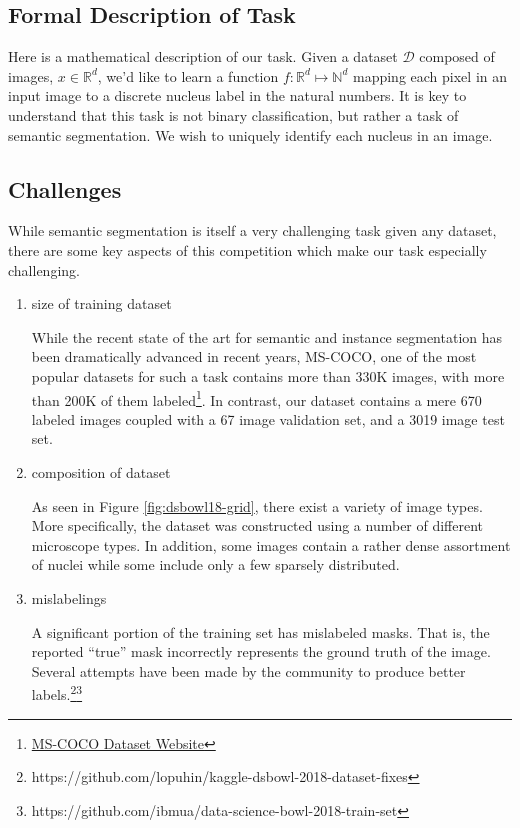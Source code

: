 \documentclass[paper=letter, fontsize=12pt]{article}
\numberwithin{equation}{section} %
\numberwithin{figure}{section} %
\numberwithin{table}{section} %
\begin{document}
\subsection{Formal Description of Task}

Here is a mathematical description of our task.  Given a dataset $\mathcal{D}$
composed of images, $x \in \mathbb{R}^{d}$, we'd like to learn a function $f :
\mathbb{R}^{d} \mapsto \mathbb{N}^{d}$ mapping each pixel in an input image to
a discrete nucleus label in the natural numbers.  It is key to understand that
this task is not binary classification, but rather a task of semantic
segmentation.  We wish to uniquely identify each nucleus in an image.

\subsection{Challenges}

While semantic segmentation is itself a very challenging task given any
dataset, there are some key aspects of this competition which make our task
especially challenging.
\begin{enumerate}
    \item size of training dataset

        While the recent state of the art for semantic and instance
        segmentation has been dramatically advanced in recent years, MS-COCO,
        one of the most popular datasets for such a task contains more than
        330K images, with more than 200K of them
        labeled\footnote{\href{http://cocodataset.org}{MS-COCO Dataset
        Website}}.  In contrast, our dataset contains a mere 670 labeled images
        coupled with a 67 image validation set, and a 3019 image test set.
    \item composition of dataset

        As seen in Figure \ref{fig:dsbowl18-grid}, there exist a variety of
        image types.  More specifically, the dataset was constructed using a
        number of different microscope types.  In addition, some images contain
        a rather dense assortment of nuclei while some include only a few
        sparsely distributed.
    \item mislabelings

        A significant portion of the training set has mislabeled masks.  That
        is, the reported ``true'' mask incorrectly represents the ground truth
        of the image.  Several attempts have been made by the community to
        produce better
        labels.\footnote{https://github.com/lopuhin/kaggle-dsbowl-2018-dataset-fixes}\footnote{https://github.com/ibmua/data-science-bowl-2018-train-set}
\end{enumerate}
\end{document}
